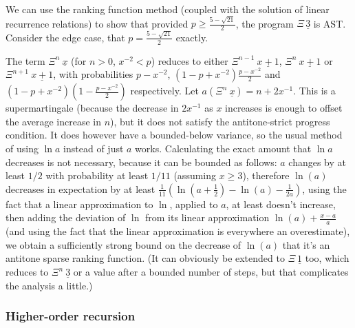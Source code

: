 We can use the ranking function method (coupled with the solution of linear recurrence relations) to show that provided $p \geq \frac{5 - \sqrt{21}}{2}$, the program $\Xi \, \underline 3$ is AST. Consider the edge case, that $p = \frac{5 - \sqrt{21}}{2}$ exactly.

The term $\Xi^n\ \underline x$ (for $n > 0$, $x^{-2} < p$) reduces to either $\Xi^{n-1}\ \underline{x+1}$, $\Xi^n\ \underline{x+1}$ or $\Xi^{n+1}\ \underline{x+1}$, with probabilities $p-x^{-2}$, $(1-p+x^{-2})\frac{p-x^{-2}}{2}$ and $(1-p+x^{-2})(1-\frac{p-x^{-2}}{2})$ respectively. Let $a(\Xi^n\ \underline x) = n + 2x^{-1}$. This is a supermartingale (because the decrease in $2x^{-1}$ as $x$ increases is enough to offset the average increase in $n$), but it does not satisfy the antitone-strict progress condition. It does however have a bounded-below variance, so the usual method of using $\ln a$ instead of just $a$ works. Calculating the exact amount that $\ln a$ decreases is not necessary, because it can be bounded as follows: $a$ changes by at least $1/2$ with probability at least $1/11$ (assuming $x \geq 3$), therefore $\ln(a)$ decreases in expectation by at least $\frac{1}{11}(\ln(a+\frac{1}{2}) - \ln(a) -\frac 1 {2a})$, using the fact that a linear approximation to $\ln$, applied to $a$, at least doesn't increase, then adding the deviation of $\ln$ from its linear approximation $\ln(a) + \frac{x-a}{a}$ (and using the fact that the linear approximation is everywhere an overestimate), we obtain a sufficiently strong bound on the decrease of $\ln(a)$ that it's an antitone sparse ranking function. (It can obviously be extended to $\Xi\ \underline 1$ too, which reduces to $\Xi^n\ \underline 3$ or a value after a bounded number of steps, but that complicates the analysis a little.)

\subsubsection*{Higher-order recursion}

